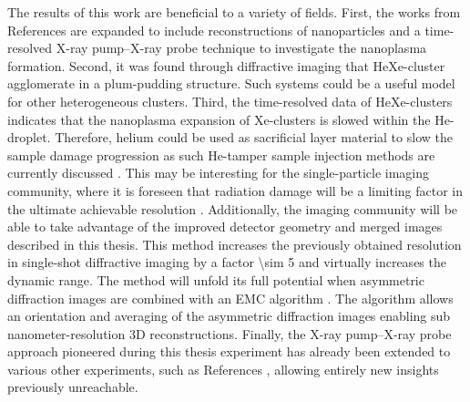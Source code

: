 %
The results of this work are beneficial to a variety of fields. First, the works from References \citep{Hoener-2008-JPB,Gorkhover-2016-NatPho} are expanded to include reconstructions of nanoparticles and a time-resolved X-ray pump--X-ray probe technique to investigate the nanoplasma formation. Second, it was found through diffractive imaging that HeXe-cluster agglomerate in a plum-pudding structure. Such systems could be a useful model for other heterogeneous clusters. Third, the time-resolved data of HeXe-clusters indicates that the nanoplasma expansion of Xe-clusters is slowed within the He-droplet. Therefore, helium could be used as sacrificial layer material to slow the sample damage progression as such He-tamper sample injection methods are currently discussed \cite{Bielecki-2016-PC}. This may be interesting for the single-particle imaging community, where it is foreseen that radiation damage will be a limiting factor in the ultimate achievable resolution \citep{Aquila-2015-StrucDyn}. Additionally, the imaging community will be able to take advantage of the improved detector geometry and merged images described in this thesis. This method increases the previously obtained resolution in single-shot diffractive imaging by a factor \num{\sim 5} and virtually increases the dynamic range. The method will unfold its full potential when asymmetric diffraction images are combined with an EMC algorithm \citep{Loh-2009-PRE}. The algorithm allows an orientation and averaging of the asymmetric diffraction images enabling sub nanometer-resolution 3D reconstructions. Finally, the X-ray pump--X-ray probe approach pioneered during this thesis experiment has already been extended to various other experiments, such as References \cite{Lehmann-2016-PRA,Kimberg-2016-FD,Al-Haddad-2017-unpublished,Ferguson-2016-SciAdv,Picon-2016-NatComm}, allowing entirely new insights previously unreachable.
